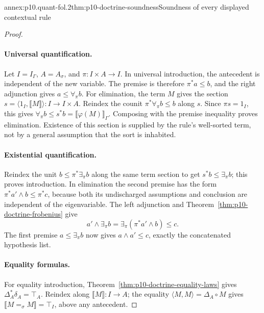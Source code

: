 \begin{annexitem}{annex:p10.quant-fol.2}{thm:p10-doctrine-soundness}{Soundness of every displayed contextual rule}
\begin{proof}
\paragraph{Universal quantification.}
Let \(I=I_\Gamma\), \(A=A_\sigma\), and \(\pi:I\times A\to I\).
In universal introduction, the antecedent is independent of the
new variable. The premise is therefore \(\pi^*a\leq b\), and
the right adjunction gives \(a\leq\forall_\pi b\).
For elimination, the term \(M\) gives the section
\(s=\langle1_I,\llbracket M\rrbracket\rangle:I\to I\times A\).
Reindex the counit \(\pi^*\forall_\pi b\leq b\) along \(s\).
Since \(\pi s=1_I\), this gives
\(\forall_\pi b\leq s^*b=\llbracket\varphi(M)\rrbracket_\Gamma\).
Composing with the premise inequality proves elimination.
Existence of this section is supplied by the rule's well-sorted term,
not by a general assumption that the sort is inhabited.

\paragraph{Existential quantification.}
Reindex the unit \(b\leq\pi^*\exists_\pi b\) along the same term
section to get \(s^*b\leq\exists_\pi b\); this proves introduction.
In elimination the second premise has the form
\(\pi^*a'\wedge b\leq\pi^*c\), because both its undischarged
assumptions and conclusion are independent of the eigenvariable.
The left adjunction and Theorem~\ref{thm:p10-doctrine-frobenius} give
\[
 a'\wedge\exists_\pi b
    =\exists_\pi(\pi^*a'\wedge b)\leq c.
\]
The first premise \(a\leq\exists_\pi b\) now gives
\(a\wedge a'\leq c\), exactly the concatenated hypothesis list.

\paragraph{Equality formulas.}
For equality introduction, Theorem~\ref{thm:p10-doctrine-equality-laws}
gives \(\Delta_A^*\delta_A=\top_A\).
Reindex along \(\llbracket M\rrbracket:I\to A\); the equality
\(\langle M,M\rangle=\Delta_A\circ M\) gives
\(\llbracket M=_\sigma M\rrbracket=\top_I\), above any antecedent.


\end{proof}
\end{annexitem}
